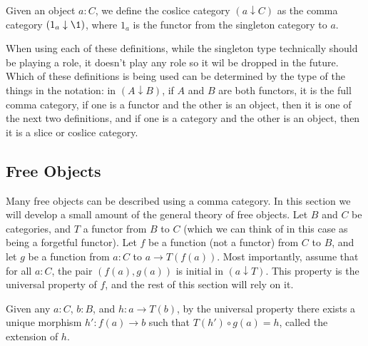 \documentclass[../../math.tex]{subfiles}
\begin{document}
\begin{definition}
    Given an object $a : C$, we define the coslice category $(a \downarrow C)$
    as the comma category $(1_a \downarrow \1)$, where $1_a$ is the functor from
    the singleton category to $a$.
\end{definition}

When using each of these definitions, while the singleton type technically
should be playing a role, it doesn't play any role so it wil be dropped in the
future.  Which of these definitions is being used can be determined by the type
of the things in the notation: in $(A \downarrow B)$, if $A$ and $B$ are both
functors, it is the full comma category, if one is a functor and the other is an
object, then it is one of the next two definitions, and if one is a category and
the other is an object, then it is a slice or coslice category.

\subsection{Free Objects}

Many free objects can be described using a comma category.  In this section we
will develop a small amount of the general theory of free objects.  Let $B$ and
$C$ be categories, and $T$ a functor from $B$ to $C$ (which we can think of in
this case as being a forgetful functor).  Let $f$ be a function (not a functor)
from $C$ to $B$, and let $g$ be a function from $a : C$ to $a \to T(f(a))$.
Most importantly, assume that for all $a : C$, the pair $(f(a), g(a))$ is
initial in $(a \downarrow T)$.  This property is the universal property of $f$,
and the rest of this section will rely on it.

\begin{definition}
    Given any $a : C$, $b : B$, and $h : a \to T(b)$, by the universal property
    there exists a unique morphism $h' : f(a) \to b$ such that $T(h') \circ g(a)
    = h$, called the extension of $h$.
\end{definition}
\end{document}

